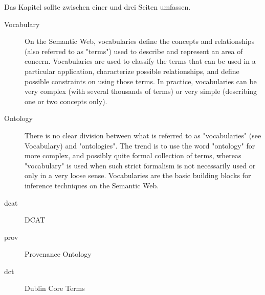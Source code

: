 \documentclass[a4paper,english,twoside,BCOR1.5cm,headsepline,DIV12,appendixprefix,final,12pt]{scrbook}
\begin{document}
Das Kapitel sollte zwischen einer und drei Seiten umfassen.


\begin{description}
\item[Vocabulary] On the Semantic Web, vocabularies define the concepts and relationships (also referred to as "terms") used to describe and represent an area of concern. Vocabularies are used to classify the terms that can be used in a particular application, characterize possible relationships, and define possible constraints on using those terms. In practice, vocabularies can be very complex (with several thousands of terms) or very simple (describing one or two concepts only)\cite{W3CVOCONTO}.

\item[Ontology] There is no clear division between what is referred to as "vocabularies" (see Vocabulary) and "ontologies". The trend is to use the word "ontology" for more complex, and possibly quite formal collection of terms, whereas "vocabulary" is used when such strict formalism is not necessarily used or only in a very loose sense. Vocabularies are the basic building blocks for inference techniques on the Semantic Web\cite{W3CVOCONTO}.
\end{description}

\begin{description}
\item [dcat] DCAT
\item [prov] Provenance Ontology
\item [dct]  Dublin Core Terms
\end{description}

%
%
\printbibliography[title=References]
\end{document}
